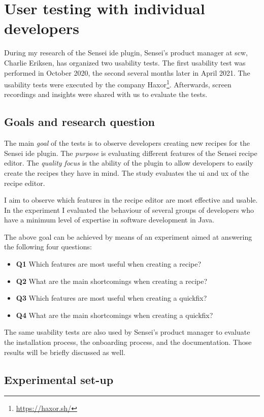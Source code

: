 \section{User testing with individual developers}
\label{sec:user-testing}
During my research of the Sensei \gls{ide} plugin, Sensei's product manager at \gls{scw}, Charlie Eriksen, has organized two usability tests.
The first usability test was performed in October 2020, the second several months later in April 2021.
The usability tests were executed by the company Haxor\footnote{\url{https://haxor.sh/}}.
Afterwards, screen recordings and insights were shared with us to evaluate the tests.

\subsection{Goals and research question}
The main \textit{goal} of the tests is to observe developers creating new recipes for the Sensei \gls{ide} plugin.
The \textit{purpose} is evaluating different features of the Sensei recipe editor.
The \textit{quality focus} is the ability of the plugin to allow developers to easily create the recipes they have in mind.
The study evaluates the \gls{ui} and \gls{ux} of the recipe editor.

I aim to observe which features in the recipe editor are most effective and usable.
In the experiment I evaluated the behaviour of several groups of developers who have a minimum level of expertise in software development in Java.

The above goal can be achieved by means of an experiment aimed at answering the following four questions:
\begin{itemize}
    \item \textbf{Q1} Which features are most useful when creating a recipe?
    \item \textbf{Q2} What are the main shortcomings when creating a recipe?
    \item \textbf{Q3} Which features are most useful when creating a quickfix?
    \item \textbf{Q4} What are the main shortcomings when creating a quickfix?
\end{itemize}

The same usability tests are also used by Sensei's product manager to evaluate the installation process, the onboarding process, and the documentation.
Those results will be briefly discussed as well.

\subsection{Experimental set-up}
